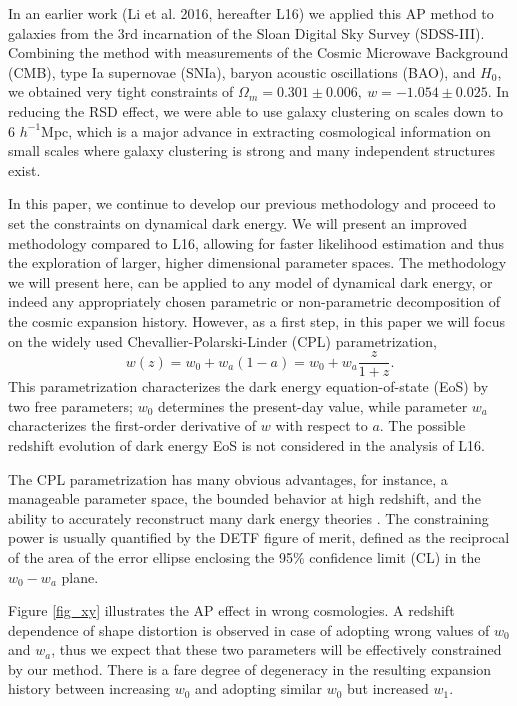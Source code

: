 \documentclass[iop]{emulateapj}
\begin{document}
In an earlier work (Li et al. 2016, hereafter L16) we applied this AP method to galaxies from the 3rd incarnation of the Sloan Digital Sky Survey (SDSS-III). 
Combining the method with measurements of the Cosmic Microwave Background (CMB), type Ia supernovae (SNIa), 
baryon acoustic oscillations (BAO), and $H_0$,
we obtained very tight constraints of $ \Omega_m = 0.301 \pm 0.006,\ w=-1.054 \pm 0.025$.
In reducing the RSD effect, 
we were able to use galaxy clustering on scales down to 6 $h^{-1}$Mpc,
which is a major advance in extracting cosmological information 
on small scales where galaxy clustering is strong and many independent structures exist.



In this paper, we continue to develop our previous methodology and proceed to set the constraints on dynamical dark energy. 
We will present an improved methodology compared to L16, 
allowing for faster likelihood estimation and thus the exploration of larger, higher dimensional parameter spaces. 
The methodology we will present here, can be applied to any model of dynamical dark energy, 
or indeed any appropriately chosen parametric or non-parametric decomposition of the cosmic expansion history. 
However, as a first step, in this paper we will focus on the widely used Chevallier-Polarski-Linder (CPL) parametrization\citep{CPL_CP,CPL_L},
\begin{equation}
w(z) = w_0 + w_a (1-a) = w_0 + w_a \frac{z}{1+z}.
\end{equation}
This parametrization characterizes the dark energy equation-of-state (EoS) by two free parameters;
$w_0$ determines the present-day value, while parameter $w_a$ characterizes the first-order derivative of $w$ with respect to $a$. 
The possible redshift evolution of dark energy EoS is not considered in the analysis of L16. 

The CPL parametrization has many obvious advantages, for instance, a manageable parameter space, 
the bounded behavior at high redshift, 
and the ability to accurately reconstruct many dark energy theories \citep{CPL_L}. 
The constraining power is usually quantified by the DETF  \citep[Dark Energy Task Force;][]{DETF} figure of merit, 
defined as the reciprocal of the area of the error ellipse enclosing the 95\% confidence limit (CL) in the $w_0 - w_a$ plane. 

Figure \ref{fig_xy} illustrates the AP effect in wrong cosmologies.
A redshift dependence of shape distortion is observed in case of adopting wrong values of $w_0$ and $w_a$,
thus we expect that these two parameters will be effectively constrained by our method.
There is a fare degree of degeneracy in the resulting expansion history
between increasing $w_0$ and adopting similar $w_0$ but increased $w_1$.
\end{document}
